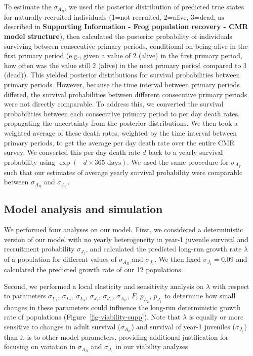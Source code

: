 \documentclass[9pt,twoside,lineno]{pnas-new-SI}
\begin{document}
To estimate the \(\sigma_{A_R}\), we used the posterior distribution of
predicted true states for naturally-recruited individuals (1=not
recruited, 2=alive, 3=dead, as described in \textbf{Supporting
Information - Frog population recovery - CMR model structure}), then
calculated the posterior probability of individuals surviving between
consecutive primary periods, conditional on being alive in the first
primary period (e.g., given a value of 2 (alive) in the first primary
period, how often was the value still 2 (alive) in the next primary
period compared to 3 (dead)). This yielded posterior distributions for
survival probabilities between primary periods. However, because the
time interval between primary periods differed, the survival
probabilities between different consecutive primary periods were not
directly comparable. To address this, we converted the survival
probabilities between each consecutive primary period to per day death
rates, propagating the uncertainty from the posterior distributions. We
then took a weighted average of these death rates, weighted by the time
interval between primary periods, to get the average per day death rate
over the entire CMR survey. We converted this per day death rate \(d\)
back to a yearly survival probability using
\(\exp(-d \times 365 \text{ days})\). We used the same procedure for
\(\sigma_{A_T}\) such that our estimates of average yearly survival
probability were comparable between \(\sigma_{A_R}\) and
\(\sigma_{A_T}\).

\hypertarget{model-analysis-and-simulation}{%
\subsection{Model analysis and
simulation}\label{model-analysis-and-simulation}}

We performed four analyses on our model. First, we considered a
deterministic version of our model with no yearly heterogeneity in
year-1 juvenile survival and recruitment probability \(\sigma_{J_1}\),
and calculated the predicted long-run growth rate \(\lambda\) of a
population for different values of \(\sigma_{A_R}\) and
\(\sigma_{J_1}\). We then fixed \(\sigma_{J_1} = 0.09\) and calculated
the predicted growth rate of our 12 populations.

Second, we performed a local elasticity and sensitivity analysis on
\(\lambda\) with respect to parameters \(\sigma_{L_1}\),
\(\sigma_{L_2}\), \(\sigma_{L_3}\), \(\sigma_{J_1}\), \(\sigma_{J_2}\),
\(\sigma_{A_R}\), \(F\), \(p_{L_2}\), \(p_{J_1}\) to determine how small
changes in these parameters could influence the long-run deterministic
growth rate of populations (Figure~\ref{fig-viability-supp}). Note
that \(\lambda\) is equally or more sensitive to changes in adult
survival (\(\sigma_{A_R}\)) and survival of year-1 juveniles
(\(\sigma_{J_1}\)) than it is to other model parameters, providing
additional justification for focusing on variation in \(\sigma_{A_R}\)
and \(\sigma_{J_1}\) in our viability analyses.
\end{document}
